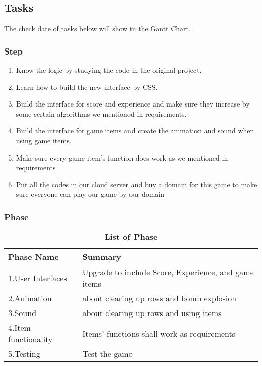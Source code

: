 \documentclass[12pt, titlepage]{article}
\begin{document}
\subsection{Tasks}
The check date of tasks below will show in the Gantt Chart.
\subsubsection{Step}
\begin{enumerate}
\item Know the logic by studying the code in the original project.
\item Learn how to build the new interface by CSS.
\item Build the interface for score and experience and make sure they increase by some certain algorithms we mentioned in requirements. 
\item Build the interface for game items and create the animation and sound when using game items.
\item Make sure every game item's function does work as we mentioned in requirements
\item Put all the codes in our cloud server and buy a domain for this game to make sure everyone can play our game by our domain

\end{enumerate}

\subsubsection{Phase}

\begin{table}[h]
\caption{\bf List of Phase} \label{tab:Phase}
\begin{tabularx}{\textwidth}{p{4cm}X}
\toprule {\bf Phase Name} & {\bf Summary}\\
\midrule
1.User Interfaces     &    Upgrade to include Score, Experience, and game items\\
2.Animation              & about clearing up rows and bomb explosion\\
3.Sound                  & about clearing up rows and using items\\
4.Item functionality  &    Items' functions shall work as requirements\\
5.Testing                & Test the game \\
\bottomrule
\end{tabularx}
\end{table}
\end{document}
